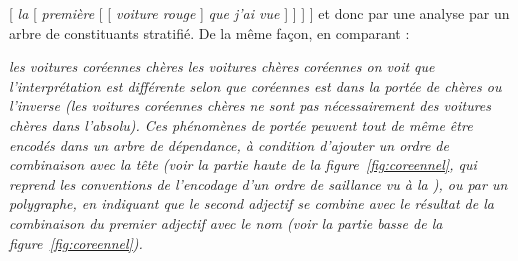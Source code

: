 {    \ea{}
    [ \textit{la} [ \textit{première} [ [ \textit{voiture rouge} ] \textit{que j’ai vue} ] ] ] ]
    \z
    et donc par une analyse par un arbre de constituants stratifié. De la même façon, en comparant :

    \ea
    \ea \itshape les voitures coréennes chères
    \ex \itshape les voitures chères coréennes
    \z
    \z
    on voit que l’interprétation est différente selon que \textit{coréennes} est dans la portée de \textit{chères} ou l’inverse (les voitures coréennes chères ne sont pas nécessairement des voitures chères dans l'absolu). Ces phénomènes de portée peuvent tout de même être encodés dans un arbre de dépendance, à condition d’ajouter un ordre de combinaison avec la tête (voir la partie haute de la figure~\ref{fig:coreennel}, qui reprend les conventions de l'encodage d'un ordre de saillance vu à la ), ou par un polygraphe, en indiquant que le second adjectif se combine avec le résultat de la combinaison du premier adjectif avec le nom (voir la partie basse de la figure~\ref{fig:coreennel}).
    
}
